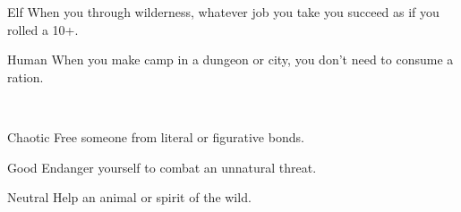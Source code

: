 \documentclass[8pt]{extarticle}
\begin{document}
\charbanner

\begin{minipage}[t]{3.2in}

\begin{optfeature}{Elf}
  When you  through wilderness,
  whatever job you take you succeed as if you rolled a 10+.
\end{optfeature}

\begin{optfeature}{Human}
  When you make camp in a dungeon or city, you don’t need to consume a
  ration.
\end{optfeature}

\ 


\begin{optfeature}{Chaotic}
  Free someone from literal or figurative bonds.
\end{optfeature}

\begin{optfeature}{Good}
  Endanger yourself to combat an unnatural threat.
\end{optfeature}

\begin{optfeature}{Neutral}
  Help an animal or spirit of the wild.
\end{optfeature}

\ 


\vfill\null
\end{minipage}
\end{document}
